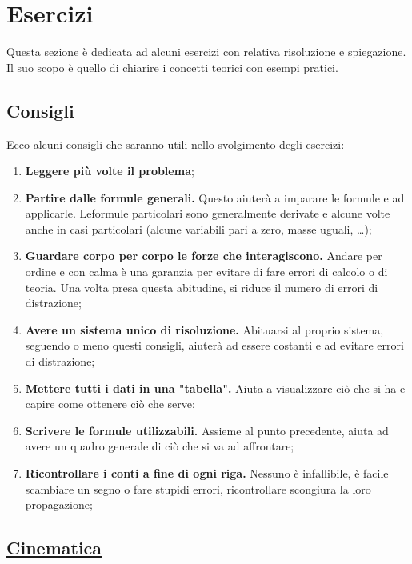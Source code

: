 
\section{Esercizi}
Questa sezione è dedicata ad alcuni esercizi con relativa risoluzione e spiegazione. Il suo scopo
è quello di chiarire i concetti teorici con esempi pratici.

\subsection*{Consigli}
Ecco alcuni consigli che saranno utili nello svolgimento degli esercizi:
\begin{enumerate}
  \item \textbf{Leggere più volte il problema};
  \item \textbf{Partire dalle formule generali.} Questo aiuterà a imparare le formule e ad 
    applicarle. Leformule particolari sono generalmente derivate e alcune volte anche in casi 
    particolari (alcune variabili pari a zero, masse uguali, \ldots);
  \item \textbf{Guardare corpo per corpo le forze che interagiscono.} Andare per ordine e con calma 
    è una garanzia per evitare di fare errori di calcolo o di teoria. Una volta presa
    questa abitudine, si riduce il numero di errori di distrazione;
  \item \textbf{Avere un sistema unico di risoluzione.} Abituarsi al proprio sistema, seguendo o 
    meno questi consigli, aiuterà ad essere costanti e ad evitare errori di distrazione;
  \item \textbf{Mettere tutti i dati in una "tabella".} Aiuta a visualizzare ciò che si ha e capire
    come ottenere ciò che serve;
  \item \textbf{Scrivere le formule utilizzabili.} Assieme al punto precedente, aiuta ad avere un
    quadro generale di ciò che si va ad affrontare;
  \item \textbf{Ricontrollare i conti a fine di ogni riga.} Nessuno è infallibile, è facile 
    scambiare un segno o fare stupidi errori, ricontrollare scongiura la loro propagazione;
\end{enumerate}

\subsection*{\hyperref[sec:cinematica]{Cinematica}}\label{ex:cinematica}

